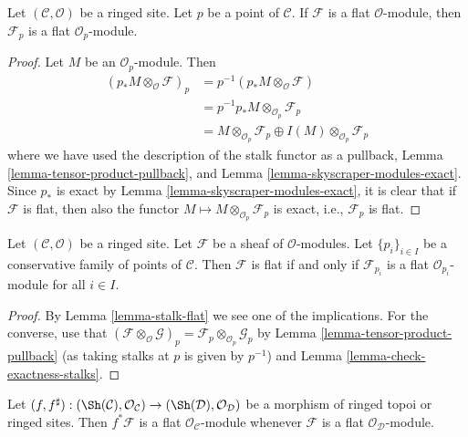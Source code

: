 \begin{lemma}
\label{lemma-stalk-flat}
Let $(\mathcal{C}, \mathcal{O})$ be a ringed site.
Let $p$ be a point of $\mathcal{C}$.
If $\mathcal{F}$ is a flat $\mathcal{O}$-module, then
$\mathcal{F}_p$ is a flat $\mathcal{O}_p$-module.
\end{lemma}

\begin{proof}
Let $M$ be an $\mathcal{O}_p$-module. Then
\begin{align*}
(p_*M \otimes_\mathcal{O} \mathcal{F})_p & =
p^{-1}(p_*M \otimes_\mathcal{O} \mathcal{F}) \\
& = p^{-1}p_*M \otimes_{\mathcal{O}_p} \mathcal{F}_p \\
& = M \otimes_{\mathcal{O}_p} \mathcal{F}_p \oplus
I(M) \otimes_{\mathcal{O}_p} \mathcal{F}_p
\end{align*}
where we have used the description of the stalk functor as a pullback,
Lemma \ref{lemma-tensor-product-pullback}, and
Lemma \ref{lemma-skyscraper-modules-exact}.
Since $p_*$ is exact by
Lemma \ref{lemma-skyscraper-modules-exact},
it is clear that if $\mathcal{F}$ is flat, then
also the functor $M \mapsto M \otimes_{\mathcal{O}_p} \mathcal{F}_p$
is exact, i.e., $\mathcal{F}_p$ is flat.
\end{proof}

\begin{lemma}
\label{lemma-check-flat-stalks}
Let $(\mathcal{C}, \mathcal{O})$ be a ringed site.
Let $\mathcal{F}$ be a sheaf of $\mathcal{O}$-modules.
Let $\{p_i\}_{i \in I}$ be a conservative family of points of $\mathcal{C}$.
Then $\mathcal{F}$ is flat if and only if $\mathcal{F}_{p_i}$ is
a flat $\mathcal{O}_{p_i}$-module for all $i \in I$.
\end{lemma}

\begin{proof}
By
Lemma \ref{lemma-stalk-flat}
we see one of the implications.
For the converse, use that
$(\mathcal{F} \otimes_\mathcal{O} \mathcal{G})_p =
\mathcal{F}_p \otimes_{\mathcal{O}_p} \mathcal{G}_p$
by
Lemma \ref{lemma-tensor-product-pullback} (as taking stalks at $p$
is given by $p^{-1}$) and
Lemma \ref{lemma-check-exactness-stalks}.
\end{proof}

\begin{lemma}
\label{lemma-pullback-flat}
Let
$(f, f^\sharp) :
(\Sh(\mathcal{C}), \mathcal{O}_\mathcal{C})
\to
(\Sh(\mathcal{D}), \mathcal{O}_\mathcal{D})$
be a morphism of ringed topoi or ringed sites.
Then $f^*\mathcal{F}$ is a flat $\mathcal{O}_\mathcal{C}$-module
whenever $\mathcal{F}$ is a flat $\mathcal{O}_\mathcal{D}$-module.
\end{lemma}

